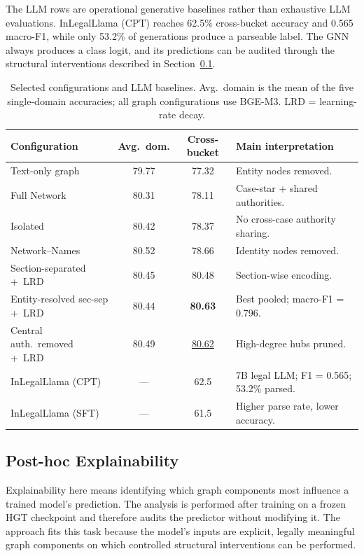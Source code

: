 \documentclass[runningheads]{llncs}
\newcommand{\best}[1]{\textbf{#1}}
\newcommand{\second}[1]{\underline{#1}}
\newcommand{\NA}{---}
\begin{document}
The LLM rows are operational generative baselines rather than exhaustive LLM evaluations. InLegalLlama (CPT) reaches 62.5\% cross-bucket accuracy and 0.565 macro-F1, while only 53.2\% of generations produce a parseable label. The GNN always produces a class logit, and its predictions can be audited
through the structural interventions described in
Section~\ref{sec:explainability}.


\begin{table}[!htbp]
\centering
\caption{Selected configurations and LLM baselines. Avg.\ domain is the mean of the five single-domain accuracies; all graph configurations use BGE-M3. LRD = learning-rate decay.}
\label{tab:accuracy-comparison}
\setlength{\tabcolsep}{4pt}
\renewcommand{\arraystretch}{1.05}
\scriptsize
\begin{tabular}{>{\raggedright\arraybackslash}p{3.7cm} c c >{\raggedright\arraybackslash}p{4.0cm}}
\toprule
Configuration & Avg.\ dom. & Cross-bucket & Main interpretation \\
\midrule
Text-only graph & 79.77 & 77.32 & Entity nodes removed. \\
Full Network & 80.31 & 78.11 & Case-star + shared authorities. \\
Isolated & 80.42 & 78.37 & No cross-case authority sharing. \\
Network--Names & 80.52 & 78.66 & Identity nodes removed. \\
Section-separated +~LRD & 80.45 & 80.48 & Section-wise encoding. \\
Entity-resolved sec-sep +~LRD & 80.44 & \best{80.63} & Best pooled; macro-F1 = 0.796. \\
Central auth.\ removed +~LRD & 80.49 & \second{80.62} & High-degree hubs pruned. \\
\midrule
InLegalLlama (CPT) & \NA & 62.5 & 7B legal LLM; F1 = 0.565; 53.2\% parsed. \\
InLegalLlama (SFT) & \NA & 61.5 & Higher parse rate, lower accuracy. \\
\bottomrule
\end{tabular}
\end{table}

\subsection{Post-hoc Explainability}
\label{sec:explainability}

Explainability here means identifying which graph components most influence
a trained model's prediction. The analysis is performed after training on a frozen HGT
checkpoint and therefore audits the predictor without modifying it. The approach fits this task because the model's inputs are explicit,
legally meaningful graph components on which controlled structural
interventions can be performed.
\end{document}
